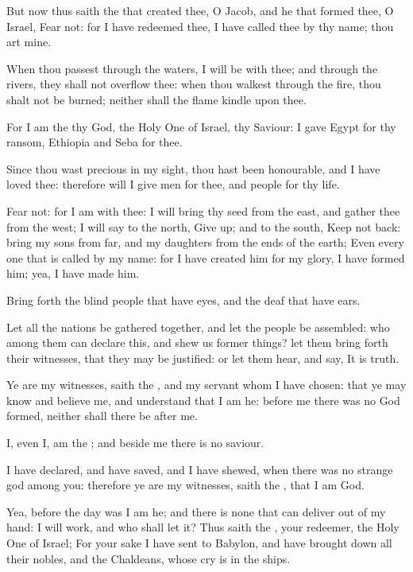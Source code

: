 \Chapter
\Verse But now thus saith the \LORD that created thee, O Jacob, and he that formed thee, O Israel, Fear not: for I have redeemed thee, I have called thee by thy name; thou art mine.

\Verse When thou passest through the waters, I will be with thee; and through the rivers, they shall not overflow thee: when thou walkest through the fire, thou shalt not be burned; neither shall the flame kindle upon thee.

\Verse For I am the \LORD thy God, the Holy One of Israel, thy Saviour: I gave Egypt for thy ransom, Ethiopia and Seba for thee.

\Verse Since thou wast precious in my sight, thou hast been honourable, and I have loved thee: therefore will I give men for thee, and people for thy life.

\Verse Fear not: for I am with thee: I will bring thy seed from the east, and gather thee from the west; \Verse I will say to the north, Give up; and to the south, Keep not back: bring my sons from far, and my daughters from the ends of the earth; \Verse Even every one that is called by my name: for I have created him for my glory, I have formed him; yea, I have made him.

\Verse Bring forth the blind people that have eyes, and the deaf that have ears.

\Verse Let all the nations be gathered together, and let the people be assembled: who among them can declare this, and shew us former things?  let them bring forth their witnesses, that they may be justified: or let them hear, and say, It is truth.

\Verse Ye are my witnesses, saith the \LORD, and my servant whom I have chosen: that ye may know and believe me, and understand that I am he: before me there was no God formed, neither shall there be after me.

\Verse I, even I, am the \LORD; and beside me there is no saviour.

\Verse I have declared, and have saved, and I have shewed, when there was no strange god among you: therefore ye are my witnesses, saith the \LORD, that I am God.

\Verse Yea, before the day was I am he; and there is none that can deliver out of my hand: I will work, and who shall let it?  \Verse Thus saith the \LORD, your redeemer, the Holy One of Israel; For your sake I have sent to Babylon, and have brought down all their nobles, and the Chaldeans, whose cry is in the ships.

